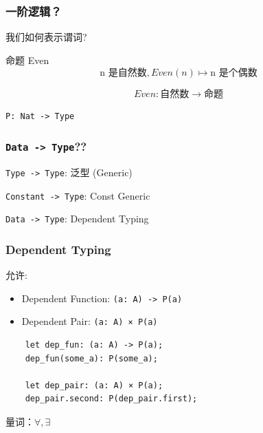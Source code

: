 \documentclass[UTF-8]{ctexbeamer}
\begin{document}
\begin{frame}
  \frametitle{一阶逻辑？}

  我们如何表示谓词?

  \begin{block}{命题 Even}
    $$
    \text{n 是自然数}, Even(n) \mapsto \text{n 是个偶数}
    $$

    \pause
    \vspace{0.5em}

    $$
    Even: \text{自然数} \rightarrow \text{命题}
    $$

    \pause
    \vspace{0.5em}

    \begin{center}
      \texttt{P: Nat -> Type}
    \end{center}
  \end{block}
\end{frame}

\begin{frame}
  \frametitle{\texttt{Data -> Type}??}

  \pause

  \texttt{Type -> Type}: 泛型 (Generic)

  \pause

  \texttt{Constant -> Type}: Const Generic

  \pause

  \texttt{Data -> Type}: Dependent Typing
\end{frame}

\begin{frame}[fragile]
  \frametitle{Dependent Typing}

  允许:
  \begin{itemize}
    \pause
    \item Dependent Function: \texttt{(a: A) -> P(a)}
    \pause
    \item Dependent Pair: \texttt{(a: A) × P(a)}
  \end{itemize}

  \pause
  \vspace{1em}

  \begin{verbatim}
    let dep_fun: (a: A) -> P(a);
    dep_fun(some_a): P(some_a);

    let dep_pair: (a: A) × P(a);
    dep_pair.second: P(dep_pair.first);
  \end{verbatim}

  \pause
  \vspace{1em}

  量词：$\forall, \exists$

\end{frame}
\end{document}
